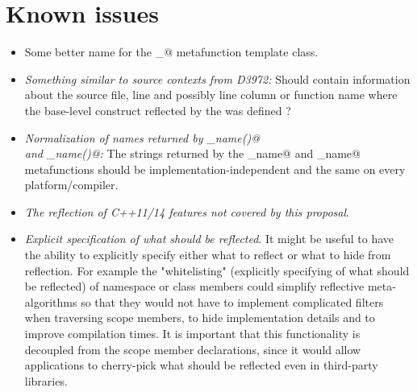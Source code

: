 \section{Known issues}

\begin{itemize}

\item Some better name for the \verb@template_@ metafunction template class.

\item {\em Something similar to source contexts from D3972:}
Should  contain information about the source file,
line and possibly line column or function name where the base-level construct
reflected by the  was defined ?

\item {\em Normalization of names returned by \verb@MetaNamed@ \verb@base_name()@\\
and \verb@MetaNamedScoped@ \verb@full_name()@:}
The strings returned by the \verb@base_name@ and \verb@full_name@ metafunctions
should be implementation-independent and the same on every platform/compiler.

\item {\em The reflection of C++11/14 features not covered by this proposal}.

\item {\em Explicit specification of what should be reflected}. It might be useful to have
the ability to explicitly specify either what to reflect or what to hide from reflection.
For example the "whitelisting" (explicitly specifying of what should be reflected) of namespace
or class members could simplify reflective meta-algorithms so that they would not have
to implement complicated filters when traversing scope members, to hide implementation details and
to improve compilation times. It is important that this functionality is decoupled from the
scope member declarations, since it would allow applications to cherry-pick what should be
reflected even in third-party libraries.

\end{itemize}

